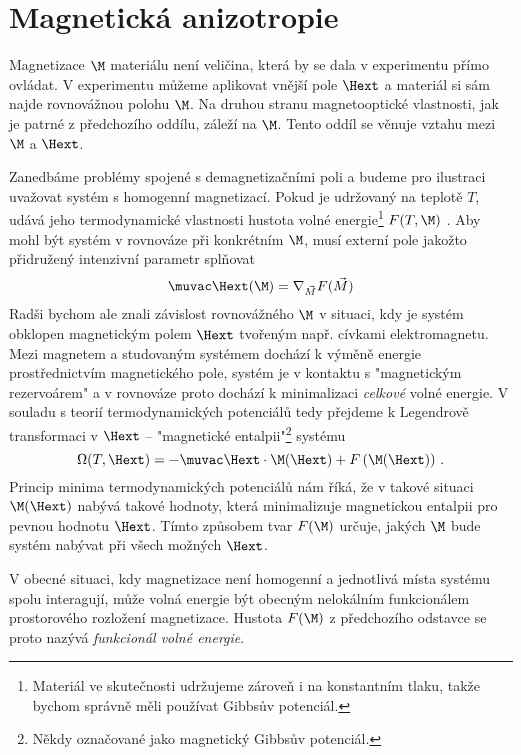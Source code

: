 \section{Magnetická anizotropie}

Magnetizace $\M$ materiálu není veličina, která by se dala v experimentu přímo ovládat.
V experimentu můžeme aplikovat vnější pole $\Hext$ a materiál si sám najde rovnovážnou polohu $\M$.
Na druhou stranu magnetooptické vlastnosti, jak je patrné z předchozího oddílu, záleží na $\M$.
Tento oddíl se věnuje vztahu mezi $\M$ a $\Hext$.

Zanedbáme problémy spojené s demagnetizačními poli a budeme pro ilustraci uvažovat systém s homogenní magnetizací.
Pokud je udržovaný na teplotě $T$, udává jeho termodynamické vlastnosti hustota volné energie\footnote{Materiál ve skutečnosti udržujeme zároveň i na konstantním tlaku, takže bychom správně měli používat Gibbsův potenciál.} $F(T,\M)$ \cite{Callen}.
Aby mohl být systém v rovnováze při konkrétním $\M$, musí externí pole jakožto přidružený intenzivní parametr splňovat
\begin{equation} \label{e:Hext=gradF}
\muvac\Hext(\M) = \nabla_{\vec{M}} F(\vec{M})
\end{equation}
Radši bychom ale znali závislost rovnovážného $\M$ v situaci, kdy je systém obklopen magnetickým polem $\Hext$ tvořeným např. cívkami elektromagnetu.
Mezi magnetem a studovaným systémem dochází k výměně energie prostřednictvím magnetického pole, systém je v kontaktu s "magnetickým rezervoárem" a v rovnováze proto dochází k minimalizaci \emph{celkové} volné energie.
V souladu s teorií termodynamických potenciálů tedy přejdeme k Legendrově transformaci v $\Hext$ -- "magnetické entalpii"\footnote{Někdy označované jako magnetický Gibbsův potenciál.} systému\cite{magentalpie}
\begin{equation} \label{e:mag entalpie}
\Omega(T,\Hext)= -\muvac\Hext\cdot\M(\Hext)+F\left(\M(\Hext)\right) \,.
\end{equation}
Princip minima termodynamických potenciálů nám říká, že v takové situaci $\M(\Hext)$ nabývá takové hodnoty, která minimalizuje magnetickou entalpii pro pevnou hodnotu $\Hext$.
Tímto způsobem tvar $F(\M)$ určuje, jakých $\M$ bude systém nabývat při všech možných $\Hext$.

V obecné situaci, kdy magnetizace není homogenní a jednotlivá místa systému spolu interagují, může volná energie být obecným nelokálním funkcionálem prostorového rozložení magnetizace.
Hustota $F(\M)$ z předchozího odstavce se proto nazývá \emph{funkcionál volné energie}.

